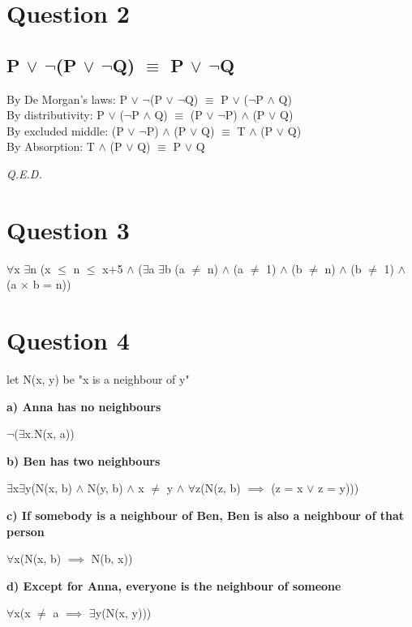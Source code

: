 \documentclass[a4paper]{article}
\begin{document}
\section*{Question 2}
\subsection*{P $\lor$ $\neg$(P $\lor$ $\neg$Q) $\equiv$ P $\lor$ $\neg$Q}
By De Morgan's laws: P $\lor$ $\neg$(P $\lor$ $\neg$Q) $\equiv$ P $\lor$ ($\neg$P $\land$ Q)\\
By distributivity:\hspace{2em} P $\lor$ ($\neg$P $\land$ Q) $\equiv$ (P $\lor$ $\neg$P) $\land$ (P $\lor$ Q)\\
By excluded middle:\hspace{5pt} (P $\lor$ $\neg$P) $\land$ (P $\lor$ Q) $\equiv$ T $\land$ (P $\lor$ Q)\\
By Absorption:\hspace{3em} T $\land$ (P $\lor$ Q) $\equiv$ P $\lor$ Q

\vspace{10pt}

\emph{Q.E.D.}

\section*{Question 3}
$\forall$x $\exists$n (x $\le$ n $\leq$ x+5 $\land$
($\exists$a $\exists$b (a $\neq$ n) $\land$ (a $\neq$ 1) $\land$ (b $\neq$ n) $\land$ (b $\neq$ 1)
$\land$ (a $\times$ b = n))

\section*{Question 4}
let N(x, y) be "x is a neighbour of y"

\noindent
\textbf{a) Anna has no neighbours}
\par\parindent 20pt
$\neg$($\exists$x.N(x, a))

\noindent
\textbf{b) Ben has two neighbours}
\par\parindent 20pt
$\exists$x$\exists$y(N(x, b) $\land$ N(y, b) $\land$ x $\neq$ y $\land$
$\forall$z(N(z, b) $\implies$ (z = x $\lor$ z = y)))

\noindent
\textbf{c) If somebody is a neighbour of Ben, Ben is also a neighbour of that person}
\par\parindent 20pt
$\forall$x(N(x, b) $\implies$ N(b, x))

\noindent
\textbf{d) Except for Anna, everyone is the neighbour of someone}
\par\parindent 20pt
$\forall$x(x $\neq$ a $\implies$ $\exists$y(N(x, y)))
\end{document}
